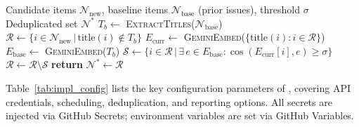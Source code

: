 \begin{algorithm}[h]
\caption{Hybrid Lexical--Semantic Deduplication}
\label{alg:hybrid_dedup}

\begin{algorithmic}[1]
\REQUIRE Candidate items $\mathcal{N}_{\text{new}}$, baseline items $\mathcal{N}_{\text{base}}$ (prior issues), threshold $\sigma$
\ENSURE Deduplicated set $\mathcal{N}^*$
\STATE $T_b \gets$ \textsc{ExtractTitles}($\mathcal{N}_{\text{base}}$)
\STATE $\mathcal{R} \gets \{i \in \mathcal{N}_{\text{new}} \,|\, \mathrm{title}(i) \notin T_b\}$ 
  \STATE $E_{\text{curr}} \gets$ \textsc{GeminiEmbed}($\{\mathrm{title}(i) : i\in\mathcal{R}\}$)
  \STATE $E_{\text{base}} \gets$ \textsc{GeminiEmbed}($T_b$)
  \STATE $\mathcal{S} \gets \{i \in \mathcal{R} \,|\, \exists\, e\in E_{\text{base}}: \cos(E_{\text{curr}}[i],e) \geq \sigma\}$
  \STATE $\mathcal{R} \gets \mathcal{R} \setminus \mathcal{S}$ 
\ENDIF
\STATE \textbf{return} $\mathcal{N}^* \gets \mathcal{R}$ 
\end{algorithmic}
\end{algorithm}

Table~\ref{tab:impl_config} lists the key configuration parameters of \trackername{}, covering API credentials, scheduling, deduplication, and reporting options. All secrets are injected via GitHub Secrets; environment variables are set via GitHub Variables.

